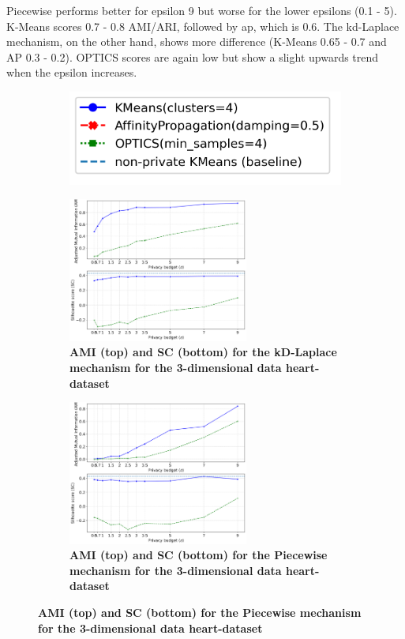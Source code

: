 Piecewise performs better for epsilon 9 but worse for the lower epsilons (0.1 - 5).
K-Means scores 0.7 - 0.8 AMI/ARI, followed by \gls{ap}, which is 0.6.
The kd-Laplace mechanism, on the other hand, shows more difference (K-Means 0.65 - 0.7 and AP 0.3 - 0.2).
OPTICS scores are again low but show a slight upwards trend when the epsilon increases.
\newpage
\begin{figure}[H]
    \centering
    \begin{subfigure}{0.3\textwidth}
        \includegraphics[width=\textwidth]{Results/2d-laplace/heart-dataset/legend.png}
    \end{subfigure}
    \begin{subfigure}{1\textwidth}
        \caption{\textbf{AMI (top) and SC (bottom) for the kD-Laplace mechanism for the 3-dimensional data heart-dataset}}
        \centering
        \includegraphics[width=0.65\textwidth]{Results/kd-laplace/kd-Laplace/heart-dataset/ami-and-sc_3_dimensions.png}
        \centering
    \end{subfigure}
    \begin{subfigure}{1\textwidth}
        \caption{\textbf{AMI (top) and SC (bottom) for the Piecewise mechanism for the 3-dimensional data heart-dataset}}
        \centering
        \includegraphics[width=0.65\textwidth]{Results/kd-laplace/piecewise/heart-dataset/ami-and-sc_3_dimensions.png}

\end{subfigure}
\end{figure}
